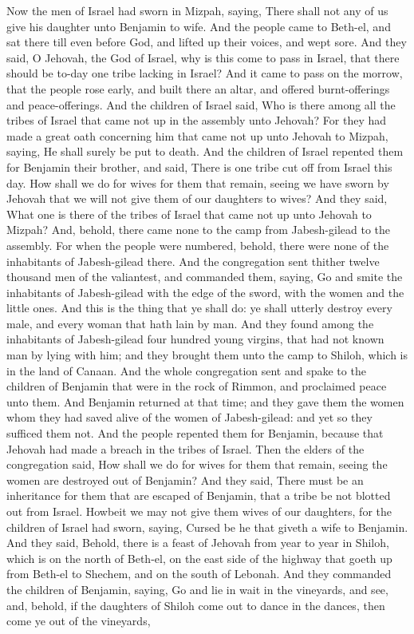 Now the men of Israel had sworn in Mizpah, saying, There shall not any of us give his daughter unto Benjamin to wife. And the people came to Beth-el, and sat there till even before God, and lifted up their voices, and wept sore. And they said, O Jehovah, the God of Israel, why is this come to pass in Israel, that there should be to-day one tribe lacking in Israel? And it came to pass on the morrow, that the people rose early, and built there an altar, and offered burnt-offerings and peace-offerings. And the children of Israel said, Who is there among all the tribes of Israel that came not up in the assembly unto Jehovah? For they had made a great oath concerning him that came not up unto Jehovah to Mizpah, saying, He shall surely be put to death. And the children of Israel repented them for Benjamin their brother, and said, There is one tribe cut off from Israel this day. How shall we do for wives for them that remain, seeing we have sworn by Jehovah that we will not give them of our daughters to wives?  And they said, What one is there of the tribes of Israel that came not up unto Jehovah to Mizpah? And, behold, there came none to the camp from Jabesh-gilead to the assembly. For when the people were numbered, behold, there were none of the inhabitants of Jabesh-gilead there. And the congregation sent thither twelve thousand men of the valiantest, and commanded them, saying, Go and smite the inhabitants of Jabesh-gilead with the edge of the sword, with the women and the little ones. And this is the thing that ye shall do: ye shall utterly destroy every male, and every woman that hath lain by man. And they found among the inhabitants of Jabesh-gilead four hundred young virgins, that had not known man by lying with him; and they brought them unto the camp to Shiloh, which is in the land of Canaan.  And the whole congregation sent and spake to the children of Benjamin that were in the rock of Rimmon, and proclaimed peace unto them. And Benjamin returned at that time; and they gave them the women whom they had saved alive of the women of Jabesh-gilead: and yet so they sufficed them not. And the people repented them for Benjamin, because that Jehovah had made a breach in the tribes of Israel.  Then the elders of the congregation said, How shall we do for wives for them that remain, seeing the women are destroyed out of Benjamin? And they said, There must be an inheritance for them that are escaped of Benjamin, that a tribe be not blotted out from Israel. Howbeit we may not give them wives of our daughters, for the children of Israel had sworn, saying, Cursed be he that giveth a wife to Benjamin. And they said, Behold, there is a feast of Jehovah from year to year in Shiloh, which is on the north of Beth-el, on the east side of the highway that goeth up from Beth-el to Shechem, and on the south of Lebonah. And they commanded the children of Benjamin, saying, Go and lie in wait in the vineyards, and see, and, behold, if the daughters of Shiloh come out to dance in the dances, then come ye out of the vineyards, 